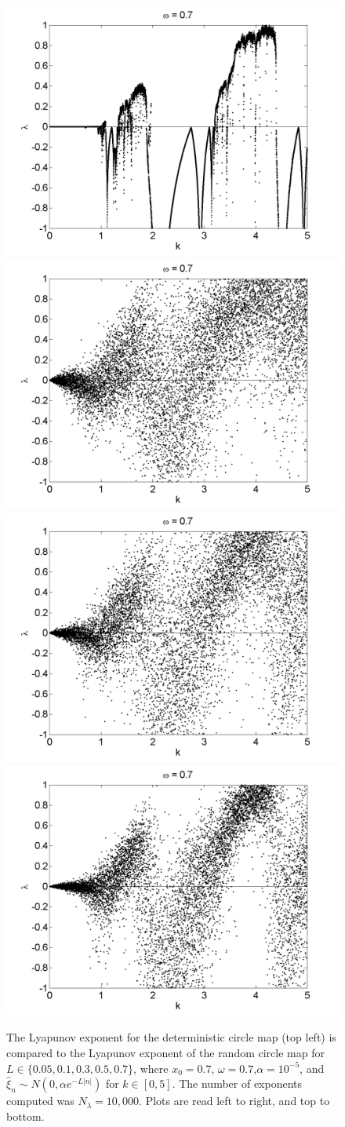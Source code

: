 \begin{figure}[!h]
\caption[Lyapunov exponent in the random circle map (normal distribution) compared to the
deterministic map, varying $k$, $\alpha = 10^{-5}$]{The Lyapunov exponent for the deterministic
  circle map (top left) is compared
  to the Lyapunov exponent of the random circle map for $L \in
  \{0.05,0.1,0.3,0.5,0.7\}$, where $x_0=0.7$, $\omega=0.7$,$\alpha =
  10^{-5}$, and $\hat{\xi}_n\sim
  N(0,\alpha e^{-L|n|})$ for $k \in [0,5]$. The number of exponents computed was $N_\lambda=10,000$. Plots are read left to right, and top to bottom. }\label{fig:rcirclyap2_n}
\centering
\includegraphics[width=.5\textwidth]{figs/det_circ_lyap_k.png}\hfill
\includegraphics[width=.5\textwidth]{figs/rcirc_n_lyap_L_005_k_10000.png}\\
\includegraphics[width=.5\textwidth]{figs/rcirc_n_lyap_L_01_k_10000.png}\hfill
\includegraphics[width=.5\textwidth]{figs/rcirc_n_lyap_L_03_k_10000.png}\\

\end{figure}
